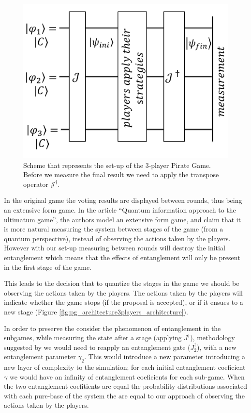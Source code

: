 \begin{figure}[h]
\centering 
\includegraphics[scale=0.35]{Figures/architecture/esquema/esquema.png}
\caption{Scheme that represents the set-up of the $3$-player Pirate Game. Before we measure the final result we need to apply the transpose operator $\mathcal{J}^{\dagger}$. }
\label{fig:pg_architecture3players}
\end{figure}



In the original game the voting results are displayed between rounds, thus being an extensive form game. In the article ``Quantum information approach to the ultimatum game''\cite{Fra2011}, the authors model an extensive form game, and claim that it is more natural measuring the system between stages of the game (from a quantum perspective), instead of observing the actions taken by the players. However with our set-up measuring between rounds will destroy the initial entanglement which means that the effects of entanglement will only be present in the first stage of the game. 

This leads to the decision that to quantize the stages in the game we should be observing the actions taken by the players. The actions taken by the players will indicate whether the game stops (if the proposal is accepted), or if it ensues to a new stage (Figure \ref{fig:pg_architecture3players_architecture}). 

In order to preserve the consider the phenomenon of entanglement in the subgames, while measuring the state after a stage (applying $J^{\dagger}$), methodology suggested by \cite{Fra2011} we would need to reapply an entanglement gate ($J_{2}^{\dagger}$), with a new entanglement parameter $\gamma_{2}$. This would introduce a new parameter introducing a new layer of complexity to the simulation; for each initial entanglement coeficient $\gamma$ we would have an infinity of entanglement coeficients for each sub-game. When the two entanglement coefitients are equal the probability distributions associated with each pure-base of the system the are equal to our approach of observing the actions taken by the players.

